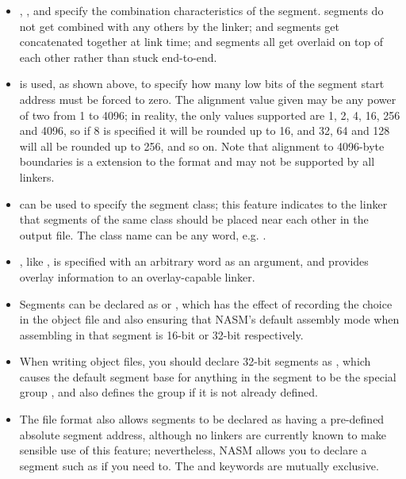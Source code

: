 \begin{itemize}
    \item{, , 
        and  specify the combination characteristics
        of the segment.  segments do not get combined
        with any others by the linker;  and 
        segments get concatenated together at link time; and 
        segments all get overlaid on top of each other rather than stuck
        end-to-end.}

    \item{ is used, as shown above, to specify how many
        low bits of the segment start address must be forced to zero.
        The alignment value given may be any power of two from 1 to 4096;
        in reality, the only values supported are 1, 2, 4, 16, 256 and 4096,
        so if 8 is specified it will be rounded up to 16, and 32, 64 and 128
        will all be rounded up to 256, and so on. Note that alignment to
        4096-byte boundaries is a  extension to the
        format and may not be supported by all linkers.
        }

    \item{ can be used to specify the segment class;
        this feature indicates to the linker that segments of the same
        class should be placed near each other in the output file.
        The class name can be any word, e.g. .}

    \item{, like , is specified with
        an arbitrary word as an argument, and provides overlay information
        to an overlay-capable linker.}

    \item{Segments can be declared as  or ,
        which has the effect of recording the choice in the object file
        and also ensuring that NASM's default assembly mode when assembling
        in that segment is 16-bit or 32-bit respectively.}

    \item{When writing  object files, you should declare
        32-bit segments as , which causes the default
        segment base for anything in the segment to be the special group
        , and also defines the group if it is not already defined.}

    \item{The  file format also allows segments to be declared as
        having a pre-defined absolute segment address, although no linkers
        are currently known to make sensible use of this feature;
        nevertheless, NASM allows you to declare a segment such as
         if you need to. The
         and  keywords are mutually
        exclusive.}
\end{itemize}

